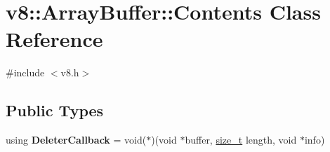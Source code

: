 \hypertarget{classv8_1_1ArrayBuffer_1_1Contents}{}\section{v8\+:\+:Array\+Buffer\+:\+:Contents Class Reference}
\label{classv8_1_1ArrayBuffer_1_1Contents}


{\ttfamily \#include $<$v8.\+h$>$}

\subsection*{Public Types}
\begin{DoxyCompactItemize}
\item 
\mbox{\label{classv8_1_1ArrayBuffer_1_1Contents_aee13ae166dcf8e210c499a81720b436d}} 
using {\bfseries Deleter\+Callback} = void($\ast$)(void $\ast$buffer, \mbox{\hyperlink{classsize__t}{size\+\_\+t}} length, void $\ast$info)
\end{DoxyCompactItemize}
